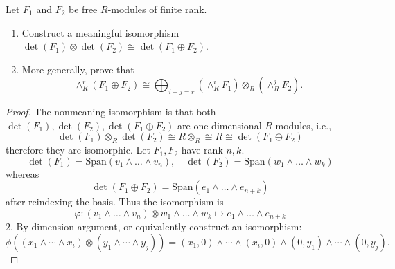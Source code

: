 \documentclass[openany]{book}
\newcommand{\tensor}{\otimes} %
\newcommand{\lambdaprod}{\wedge} %
\begin{document}
    \begin{prob}[4.4]
    Let \(F_1\) and \(F_2\) be free \(R\)-modules of finite rank.
    \begin{enumerate}
        \item Construct a meaningful isomorphism \(\det(F_1) \tensor \det(F_2) \cong \det(F_1 \oplus F_2)\).
        \item More generally, prove that
        \[
        \lambdaprod^r_R(F_1 \oplus F_2) \cong \bigoplus_{i+j=r} (\lambdaprod^i_R F_1) \tensor_R (\lambdaprod^j_R F_2).
        \]
    \end{enumerate}
    \end{prob}
    \begin{proof}
        The nonmeaning isomorphism is that both $\det(F_1), \det(F_2), \det(F_1\oplus F_2)$ are one-dimensional $R$-modules, i.e., 
        \begin{equation*}
            \det(F_1)\otimes_R\det(F_2)\cong R\otimes_R\cong R\cong\det(F_1\oplus F_2)
        \end{equation*}
        therefore they are isomorphic. Let $F_1,F_2$ have rank $n,k$. 
        \begin{equation*}
            \det(F_1)=\text{Span}(v_1\wedge\dots\wedge v_n), \quad \det(F_2)=\text{Span}(w_1\wedge\dots\wedge w_k)
        \end{equation*}
        whereas 
        \begin{equation*}
            \det(F_1\oplus F_2)=\text{Span}(e_1\wedge\dots\wedge e_{n+k})
        \end{equation*}
        after reindexing the basis. Thus the isomorphism is 
        \begin{equation*}
            \varphi: (v_1\wedge\dots\wedge v_n)\otimes w_1\wedge\dots\wedge w_k\mapsto e_1\wedge\dots\wedge e_{n+k}
        \end{equation*}
        2. By dimension argument, or equivalently construct an isomorphism: 
        \[
\phi\left( (x_1 \wedge \cdots \wedge x_i) \otimes (y_1 \wedge \cdots \wedge y_j) \right) = (x_1, 0) \wedge \cdots \wedge (x_i, 0) \wedge (0, y_1) \wedge \cdots \wedge (0, y_j).
\]
    \end{proof}

    
    
\end{document}
